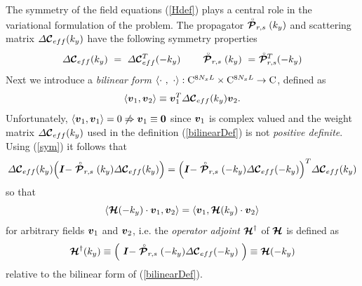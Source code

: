 The symmetry of the field equations (\ref{Hdef}) plays a central role in 
the variational formulation of the problem.
The propagator $\rf{\CB P}_{r,s}(k_y)$ and scattering matrix 
${\mit \Delta}{\CB C}_{eff}(k_y)$  have the following symmetry properties
\begin{equation} \label{sym}
	{\mit \Delta}{\CB C}_{eff}(k_y)\ =\  {\mit \Delta}{\CB 
	C}{}^{T}_{eff}(-k_y) \qquad 
\rf{\CB P}_{r,s}(k_y)\ =\  \rf{\CB P}\!\!{}_{r,s}^{ T}(-k_y)
\end{equation}
Next we introduce a {\em bilinear form\/} $\left\langle{ \cdot \ ,\ \cdot 
}\right\rangle:
{\Bbb{C}}^{8 N_x L}\times {\Bbb{C}}^{8 N_x L} \rightarrow 
{\Bbb{C}}$, defined as 
\begin{equation} \label{bilinearDef}
	\left\langle{ {\bmi  v}_{1} , {\bmi  v}_2 }\right\rangle \equiv {\bmi  
	v}^{T}_{1}   {\mit \Delta}{\CB C}_{eff}(k_y)   {\bmi  v}_2.
\end{equation}  
Unfortunately, $\left\langle{ {\bmi  v}_{1}  , {\bmi  v}_{1} 
}\right\rangle=0 
\not\Rightarrow {\bmi  v}_{1}\equiv{\bf  0}$ since ${\bmi  v}_1$ is 
complex 
valued and 
the weight matrix $ {\mit \Delta}{\CB C}_{eff}(k_y)$ 
used in the definition (\ref{bilinearDef}) is not {\em positive 
definite}.
Using (\ref{sym}) it follows that
\[
{\mit \Delta}{\CB C}_{eff}(k_y) {\left({ {\bmi { I}} -\rf{\CB P}_{r,s}(k_y)
{\mit \Delta}{\CB C}_{eff}(k_y)  }\right)} = {\left({  {\bmi { I}} 
-\rf{\CB P}_{r,s}(-k_y)
{\mit \Delta}{\CB C}_{eff}(-k_y)  }\right)}^{T} {\mit \Delta}{\CB 
C}_{eff}(k_y)
\]
so that
\begin{equation} \label{HsymDef}
	\left\langle{{\CB H}(-k_y) \cdot  {\bmi  v}_1,{\bmi  v}_2}\right\rangle=
	\left\langle{{\bmi  v}_1,{\CB H}(k_y) \cdot {\bmi  v}_2}\right\rangle
\end{equation}
for arbitrary fields ${\bmi  v}_1$ and ${\bmi  v}_2$, i.e. the {\em 
operator 
adjoint\/} ${\CB 
H}^{\dagger}$ of ${\CB H}$ is defined as
\begin{equation} \label{Htdef}
{\CB H}^{\dagger}(k_y)
 \equiv 
{\left({ \ {\bmi { I}} -\rf{\CB P}_{r,s}(-k_y)
	{\mit \Delta}{\CB C}_{eff}(-k_y) \ }\right)}\equiv {\CB H}(-k_y)
\end{equation} 
relative to the bilinear form of  (\ref{bilinearDef}). 




